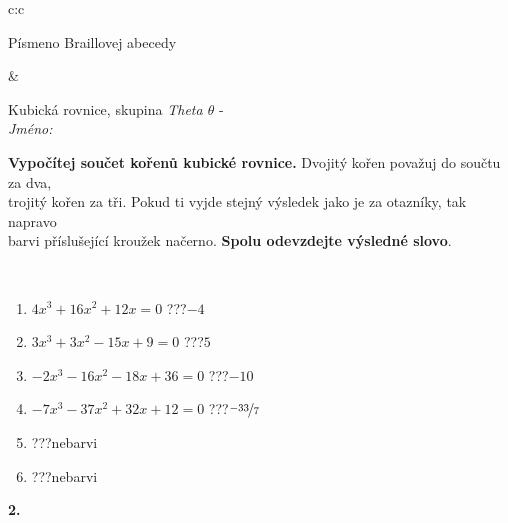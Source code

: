 \documentclass[10pt]{report}
\begin{document}
\begin{tabular}{c:c}
\begin{minipage}[c][104.5mm][t]{0.5\linewidth}
\begin{center}
\begin{minipage}{0.20\linewidth}
\begin{center}
{\small Písmeno Braillovej abecedy}
\end{center}
\end{minipage}
\end{center}
\end{minipage}
&
\begin{minipage}[c][104.5mm][t]{0.5\linewidth}
\begin{center}
\vspace{7mm}
{\huge Kubická rovnice, skupina \textit{Theta $\theta$} -}\\[5mm]
\textit{Jméno:}\phantom{xxxxxxxxxxxxxxxxxxxxxxxxxxxxxxxxxxxxxxxxxxxxxxxxxxxxxxxxxxxxxxxxx}\\[5mm]
\begin{minipage}{0.95\linewidth}
\begin{center}
\textbf{Vypočítej součet kořenů kubické rovnice.} Dvojitý kořen považuj do součtu za dva,\\trojitý kořen za tři. Pokud ti vyjde stejný výsledek jako je za otazníky, tak napravo\\barvi příslušející kroužek načerno. \textbf{Spolu odevzdejte výsledné slovo}.
\end{center}
\end{minipage}
\\[1mm]
\begin{minipage}{0.79\linewidth}
\begin{center}
\begin{varwidth}{\linewidth}
\begin{enumerate}
\Large
\item $4x^3+16x^2+12x=0$\quad \dotfill\; ???\;\dotfill \quad $-4$
\item $3x^3+3x^2-15x+9=0$\quad \dotfill\; ???\;\dotfill \quad $5$
\item $-2x^3-16x^2-18x+36=0$\quad \dotfill\; ???\;\dotfill \quad $-10$
\item $-7x^3-37x^2+32x+12=0$\quad \dotfill\; ???\;\dotfill \quad $\nicefrac{-33}{7}$
\item \quad \dotfill\; ???\;\dotfill \quad nebarvi
\item \quad \dotfill\; ???\;\dotfill \quad nebarvi
\end{enumerate}
\end{varwidth}
\end{center}
\end{minipage}
\begin{minipage}{0.20\linewidth}
\begin{center}
{\Huge\bfseries 2.} \\[2mm]

\end{center}
\end{minipage}
\end{center}
\end{minipage}
\end{tabular}
\end{document}

